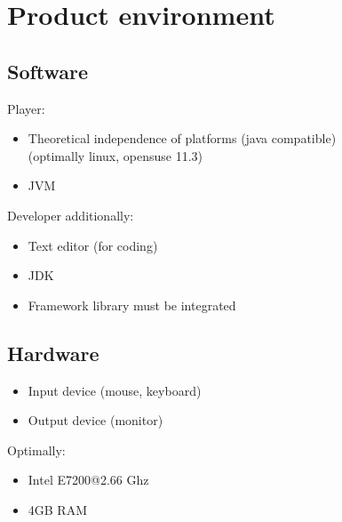\section{Product environment}

\subsection{Software}
Player:
\begin{itemize}
\item Theoretical independence of platforms (\Gls{java} compatible) \\ 
	(optimally \gls{linux}, \gls{opensuse} 11.3)
\item \Gls{JVM}
\end{itemize}
Developer additionally:
\begin{itemize}
\item Text editor (for coding)
\item \Gls{JDK}
\item Framework library must be integrated
\end{itemize}

\subsection{Hardware}
\begin{itemize}
\item Input device (mouse, keyboard)
\item Output device (monitor)
\end{itemize}
Optimally:
\begin{itemize}
\item Intel E7200@2.66 Ghz
\item 4GB RAM
\end{itemize}